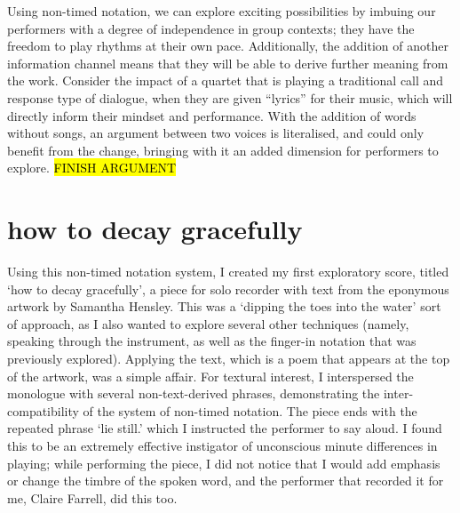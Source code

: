 Using non-timed notation, we can explore exciting possibilities by imbuing our performers with a degree of independence in group contexts; 
they have the freedom to play rhythms at their own pace. 
Additionally, the addition of another information channel means that they will be able to derive further meaning from the work. 
Consider the impact of a quartet that is playing a traditional call and response type of dialogue, when they are given ``lyrics'' for their music, which will directly inform their mindset and performance. 
With the addition of words without songs, an argument between two voices is literalised, and could only benefit from the change, bringing with it an added dimension for performers to explore. \hl{FINISH ARGUMENT}

\section{how to decay gracefully}

Using this non-timed notation system, I created my first exploratory score, titled `how to decay gracefully', a piece for solo recorder with text from the eponymous artwork by Samantha Hensley.
This was a `dipping the toes into the water' sort of approach, as I also wanted to explore several other techniques (namely, speaking through the instrument, as well as the finger-in notation that was previously explored). 
Applying the text, which is a poem that appears at the top of the artwork, was a simple affair. 
For textural interest, I interspersed the monologue with several non-text-derived phrases, demonstrating the inter-compatibility of the system of non-timed notation.
The piece ends with the repeated phrase `lie still.' which I instructed the performer to say aloud. 
I found this to be an extremely effective instigator of unconscious minute differences in playing; 
while performing the piece, I did not notice that I would add emphasis or change the timbre of the spoken word, and the performer that recorded it for me, Claire Farrell, did this too.
